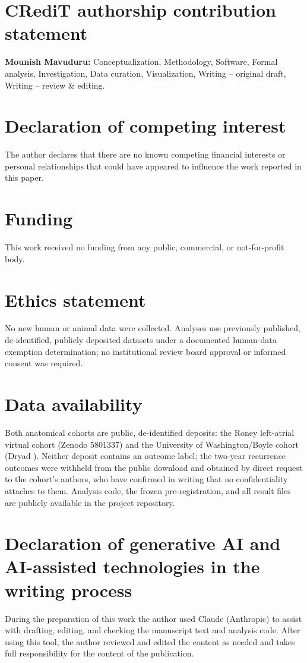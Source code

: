 \section*{CRediT authorship contribution statement}
\noindent\textbf{Mounish Mavuduru:} Conceptualization, Methodology, Software,
Formal analysis, Investigation, Data curation, Visualization, Writing -- original
draft, Writing -- review \& editing.

\section*{Declaration of competing interest}
The author declares that there are no known competing financial interests or
personal relationships that could have appeared to influence the work reported
in this paper.

\section*{Funding}
This work received no funding from any public, commercial, or not-for-profit
body.

\section*{Ethics statement}
No new human or animal data were collected. Analyses use previously published,
de-identified, publicly deposited datasets under a documented human-data
exemption determination; no institutional review board approval or informed
consent was required.

\section*{Data availability}
Both anatomical cohorts are public, de-identified deposits: the Roney
left-atrial virtual cohort (Zenodo 5801337) and the University of
Washington/Boyle cohort (Dryad ). Neither deposit
contains an outcome label; the two-year recurrence outcomes were withheld from
the public download and obtained by direct request to the cohort's authors, who
have confirmed in writing that no confidentiality attaches to them. Analysis
code, the frozen pre-registration, and all result files are publicly available
in the project repository.

\section*{Declaration of generative AI and AI-assisted technologies in the writing process}
During the preparation of this work the author used Claude (Anthropic) to assist
with drafting, editing, and checking the manuscript text and analysis code.
After using this tool, the author reviewed and edited the content as needed and
takes full responsibility for the content of the publication.

